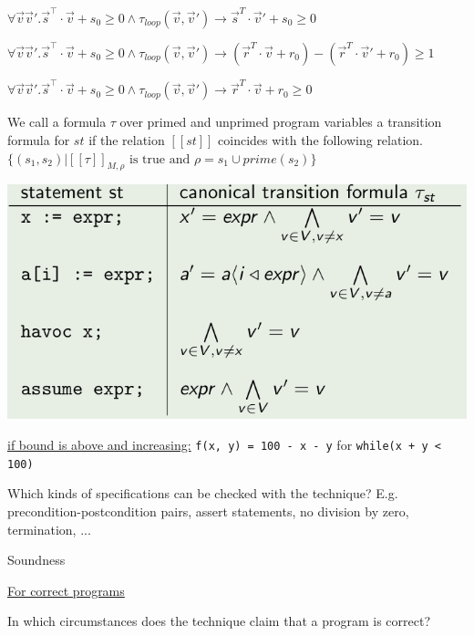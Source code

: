 \documentclass[a4paper]{article}
\begin{document}
\begin{minipage}[t]{0.16\linewidth}
\begin{betterlist}
{{\begin{betterlist}
\begin{betterlist}
\begin{betterlist}
							\item $\forall\vec{v}\vec{v}'.\vec{s}^⊺\cdot \vec{v} + s_0 \geq 0 \land \tau_{loop}(\vec{v},\vec{v}') \rightarrow\vec{s}^T\cdot \vec{v}' + s_0 \geq 0$
							\item $\forall\vec{v}\vec{v}'.\vec{s}^⊺\cdot \vec{v} + s_0 \geq 0 \land \tau_{loop}(\vec{v},\vec{v}') \rightarrow (\vec{r}^T\cdot \vec{v} + r_0) −(\vec{r}^T\cdot \vec{v}'  + r_0) \geq 1$
							\item $\forall\vec{v}\vec{v}'.\vec{s}^⊺\cdot \vec{v} + s_0 \geq 0 \land \tau_{loop}(\vec{v},\vec{v}') \rightarrow\vec{r}^T\cdot \vec{v} + r_0 \geq 0$
						\end{betterlist}
					\end{betterlist}
					\item We call a formula $\tau$ over primed and unprimed program variables a \alert{transition formula} for $st$ if the relation $[[st]]$ coincides with the following relation. $\{(s_1, s_2) | [[\tau]]_{M,\rho} \text{ is true and } \rho = s_1 \cup prime(s_2)\}$

					\includegraphics[width=0.5\linewidth]{./figures/transition_formulas.png}
					\item \underline{if bound is above and increasing:} \texttt{f(x, y) = 100 - x - y} for \texttt{while(x + y < 100)}
				\end{betterlist}
			}}
		\item Which kinds of specifications can be checked with the technique? E.g. precondition-postcondition pairs, assert statements, no division by zero, termination, ...

		\item \alert{Soundness}
		\begin{betterlist}
			\item \underline{For correct programs}
			\begin{betterlist}
				\item In which circumstances does the technique claim that a program is correct?


\end{betterlist}
\end{betterlist}
\end{betterlist}
\end{minipage}
\end{document}
